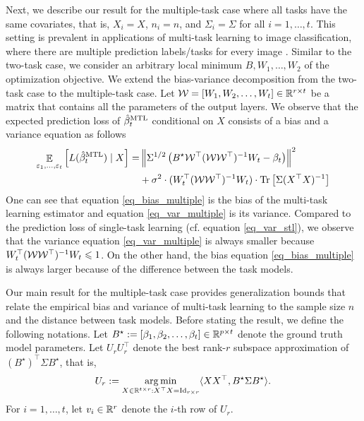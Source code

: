 Next, we describe our result for the multiple-task case where all tasks have the same covariates, that is, $X_i = X$, $n_i = n$, and $\Sigma_i = \Sigma$ for all $i = 1, \dots, t$.
This setting is prevalent in applications of multi-task learning to image classification, where there are multiple prediction labels/tasks for every image \cite{chexnet17,EA20}.
Similar to the two-task case, we consider an arbitrary local minimum $B, W_1, \dots, W_2$ of the optimization objective.
We extend the bias-variance decomposition from the two-task case to the multiple-task case.
Let $\mathcal W = [W_1, W_2, \dots, W_t] \in \mathbb{R}^{r\times t}$ be a matrix that contains all the parameters of the output layers.
We observe that the expected prediction loss of $\hat{\beta}_t^{\textup{MTL}}$ conditional on $X$ consists of a bias and a variance equation as follows
\begin{align}
	\mathop{\mathbb{E}}_{\varepsilon_1, \dots, \varepsilon_t}\left[ L(\hat{\beta}_t^{\textup{MTL}}) \mid X \right]
	=& \left\| \Sigma^{1/2} \left({B^{\star} {\mathcal W}^{\top} ({\mathcal W} {\mathcal W}^{\top})^{-1} W_t - \beta_t}\right) \right\|^2 \label{eq_bias_multiple} \\
	&+ \sigma^2 \cdot (W_t^{\top} ({\mathcal W} {\mathcal W}^{\top})^{-1} W_t) \cdot \operatorname{Tr}\left[\Sigma (X^{\top} X)^{-1}\right] \label{eq_var_multiple}
\end{align}
One can see that equation \eqref{eq_bias_multiple} is the bias of the multi-task learning estimator and equation \eqref{eq_var_multiple} is its variance.
Compared to the prediction loss of single-task learning (cf. equation \eqref{eq_var_stl}), we observe that the variance equation \eqref{eq_var_multiple} is always smaller because $W_t^{\top} ({\mathcal W} {\mathcal W}^{\top})^{-1} W_t \leqslant 1$.
On the other hand, the bias equation \eqref{eq_bias_multiple} is always larger because of the difference between the task models.

Our main result for the multiple-task case provides generalization bounds that relate the empirical bias and variance of multi-task learning to the sample size $n$ and the distance between task models.
Before stating the result, we define the following notations.
Let $B^\star := [{\beta}_1,{\beta}_2,\dots,{\beta}_{t}] \in \mathbb{R}^{p\times t}$ denote the ground truth model parameters.
Let $U_r U_r^{\top}$ denote the best rank-$r$ subspace approximation of $(B^{\star})^\top\Sigma B^{\star}$, that is,
\[ U_r := \operatorname*{arg\,min}_{X\in\mathbb{R}^{t\times r} : X^{\top} X = \operatorname{Id}_{r\times r}} \langle X X^{\top}, B^{\star} \Sigma B^{\star} \rangle. \]
For $i = 1,\dots, t$, let $v_i \in\mathbb{R}^r$ denote the $i$-th row of $U_r$.

